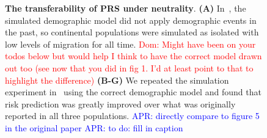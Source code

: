 \documentclass{article}
\newcommand{\aprcomment}[1]{{\textcolor{blue}{APR: #1}}}
\newcommand{\dncomment}[1]{{\textcolor{red}{Dom: #1}}}
\begin{document}
\begin{figure}[ht]
\begin{center}
\caption{\textbf{The transferability of PRS under neutrality}.
    \textbf{(A)} In~\citet{martin2017human}, the simulated demographic model did not apply demographic
    events in the past, so continental populations were simulated as isolated with low levels of migration
    for all time.
    \dncomment{Might have been on your todos below but would help I think to have the correct model 
    drawn out too (see now that you did in fig 1. I'd at least point to that to highlight the difference)}
    \textbf{(B-G)} We repeated the simulation experiment in~\cite{martin2017human} using the correct 
    demographic model and found that risk prediction was greatly improved over what was originally 
    reported in all three populations.
    \aprcomment{directly compare to figure 5 in the original paper}
    \aprcomment{to do: fill in caption}
}
\label{fig:prs}
\end{center}
\end{figure}
\end{document}
